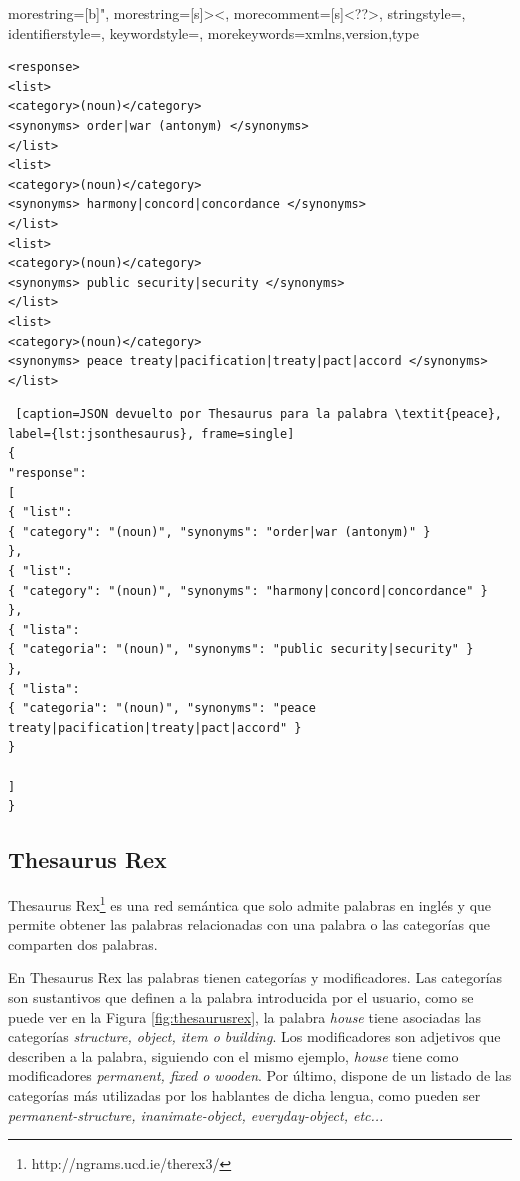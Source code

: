 {
	morestring=[b]",
	morestring=[s]{>}{<},
	morecomment=[s]{<?}{?>},
	stringstyle=\color{black},
	identifierstyle=\color{darkblue},
	keywordstyle=\color{cyan},
	morekeywords={xmlns,version,type}%
}



\lstset{language=XML}
\begin{lstlisting}[caption= XML devuelto por Thesaurus para la palabra \textit{peace}, label={lst:xmlthesaurus}, frame=single]
<response> 
<list>
<category>(noun)</category> 
<synonyms> order|war (antonym) </synonyms>
</list>
<list>
<category>(noun)</category> 
<synonyms> harmony|concord|concordance </synonyms>
</list>
<list>
<category>(noun)</category> 
<synonyms> public security|security </synonyms>
</list>
<list>
<category>(noun)</category> 
<synonyms> peace treaty|pacification|treaty|pact|accord </synonyms>
</list>
\end{lstlisting}






\begin{lstlisting} [caption=JSON devuelto por Thesaurus para la palabra \textit{peace}, label={lst:jsonthesaurus}, frame=single]
{
"response":
[
{ "list": 
{ "category": "(noun)", "synonyms": "order|war (antonym)" }
},
{ "list": 
{ "category": "(noun)", "synonyms": "harmony|concord|concordance" }
},
{ "lista": 
{ "categoria": "(noun)", "synonyms": "public security|security" }
},
{ "lista": 
{ "categoria": "(noun)", "synonyms": "peace treaty|pacification|treaty|pact|accord" }
}

]
}
\end{lstlisting}




\subsection{Thesaurus Rex}
\label{cap:subsec:thesaurusrex}

Thesaurus Rex\footnote{http://ngrams.ucd.ie/therex3/} es una red semántica que solo admite palabras en inglés y que permite obtener las palabras relacionadas con una palabra o las categorías que comparten dos palabras.

En Thesaurus Rex las palabras tienen categorías y modificadores. Las categorías son sustantivos que definen a la palabra introducida por el usuario, como se puede ver en la Figura \ref{fig:thesaurusrex}, la palabra \textit{house} tiene asociadas las categorías \textit{structure, object, item o building}. Los modificadores son adjetivos que describen a la palabra, siguiendo con el mismo ejemplo, \textit{house} tiene como modificadores \textit{permanent, fixed o wooden}. Por último, dispone de un listado de las categorías más utilizadas por los hablantes de dicha lengua, como pueden ser \textit{permanent-structure, inanimate-object, everyday-object, etc...} 

